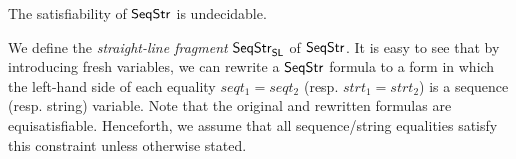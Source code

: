 
\begin{proposition}\label{prop-undec}
	The satisfiability of ${\sf SeqStr}$ is undecidable.
\end{proposition}
%

We define the \emph{straight-line fragment} ${\sf SeqStr}_{\sf SL}$ of ${\sf SeqStr}$. It is easy to see that by introducing fresh %
variables, we can rewrite a ${\sf SeqStr}$ formula to a form in which the left-hand side of each equality $seqt_1 = seqt_2$ (resp. $strt_1 = strt_2$) is a sequence (resp. string) variable.
%
Note that the original and rewritten formulas are equisatisfiable. %
Henceforth, we assume that all sequence/string equalities satisfy this constraint unless otherwise stated. %


